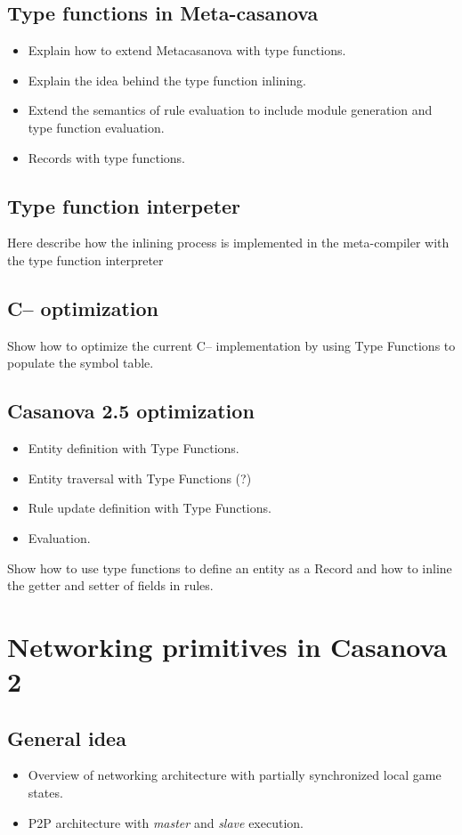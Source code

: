 \documentclass[8pt,a5paper]{extbook}
\begin{document}
\section{Type functions in Meta-casanova}
\begin{itemize}[noitemsep]
	\item Explain how to extend Metacasanova with type functions.
	\item Explain the idea behind the type function inlining.
	\item Extend the semantics of rule evaluation to include module generation and type function evaluation.
	\item Records with type functions.
\end{itemize}

\section{Type function interpeter}
Here describe how the inlining process is implemented in the meta-compiler with the type function interpreter

\section{C-- optimization}
Show how to optimize the current C-- implementation by using Type Functions to populate the symbol table.

\section{Casanova 2.5 optimization}
\begin{itemize}[noitemsep]
	\item Entity definition with Type Functions.
	\item Entity traversal with Type Functions (?)
	\item Rule update definition with Type Functions.
	\item Evaluation.
\end{itemize}
Show how to use type functions to define an entity as a Record and how to inline the getter and setter of fields in rules.
	
\chapter{Networking primitives in Casanova 2}
\section{General idea}
	\begin{itemize}[noitemsep]
		\item Overview of networking architecture with partially synchronized local game states.
		\item P2P architecture with \textit{master} and \textit{slave} execution.
	\end{itemize}
	
\end{document}

